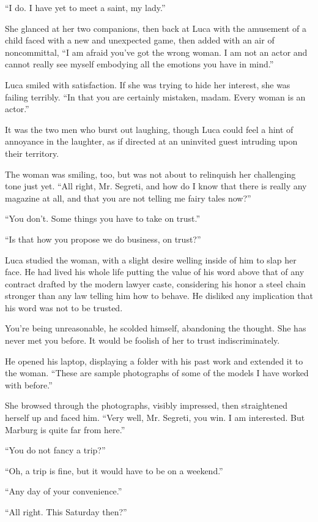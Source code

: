 ``I do. I have yet to meet a saint, my lady.''

She glanced at her two companions, then back at Luca with the amusement of a child faced with a new and unexpected game, then added with an air of noncommittal, ``I am afraid you've got the wrong woman. I am not an actor and cannot really see myself embodying all the emotions you have in mind.''

Luca smiled with satisfaction. If she was trying to hide her interest, she was failing terribly. ``In that you are certainly mistaken, madam. Every woman is an actor.''

It was the two men who burst out laughing, though Luca could feel a hint of annoyance in the laughter, as if directed at an uninvited guest intruding upon their territory.

The woman was smiling, too, but was not about to relinquish her challenging tone just yet. ``All right, Mr. Segreti, and how do I know that there is really any magazine at all, and that you are not telling me fairy tales now?''

``You don't. Some things you have to take on trust.''

``Is that how you propose we do business, on trust?''

Luca studied the woman, with a slight desire welling inside of him to slap her face. He had lived his whole life putting the value of his word above that of any contract drafted by the modern lawyer caste, considering his honor a steel chain stronger than any law telling him how to behave. He disliked any implication that his word was not to be trusted.

You're being unreasonable, he scolded himself, abandoning the thought. She has never met you before. It would be foolish of her to trust indiscriminately.

He opened his laptop, displaying a folder with his past work and extended it to the woman. ``These are sample photographs of some of the models I have worked with before.''

She browsed through the photographs, visibly impressed, then straightened herself up and faced him. ``Very well, Mr. Segreti, you win. I am interested. But Marburg is quite far from here.''

``You do not fancy a trip?''

``Oh, a trip is fine, but it would have to be on a weekend.''

``Any day of your convenience.''

``All right. This Saturday then?''

